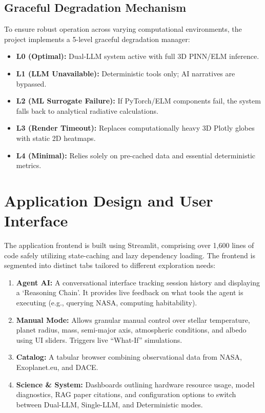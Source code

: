 \documentclass[12pt,a4paper]{article}
\begin{document}
\subsection{Graceful Degradation Mechanism}
To ensure robust operation across varying computational environments, the project implements a 5-level graceful degradation manager:
\begin{itemize}
    \item \textbf{L0 (Optimal):} Dual-LLM system active with full 3D PINN/ELM inference.
    \item \textbf{L1 (LLM Unavailable):} Deterministic tools only; AI narratives are bypassed.
    \item \textbf{L2 (ML Surrogate Failure):} If PyTorch/ELM components fail, the system falls back to analytical radiative calculations.
    \item \textbf{L3 (Render Timeout):} Replaces computationally heavy 3D Plotly globes with static 2D heatmaps.
    \item \textbf{L4 (Minimal):} Relies solely on pre-cached data and essential deterministic metrics.
\end{itemize}

\section{Application Design and User Interface}
The application frontend is built using Streamlit, comprising over 1,600 lines of code safely utilizing state-caching and lazy dependency loading. The frontend is segmented into distinct tabs tailored to different exploration needs:

\begin{enumerate}
    \item \textbf{Agent AI:} A conversational interface tracking session history and displaying a `Reasoning Chain'. It provides live feedback on what tools the agent is executing (e.g., querying NASA, computing habitability).
    \item \textbf{Manual Mode:} Allows granular manual control over stellar temperature, planet radius, mass, semi-major axis, atmospheric conditions, and albedo using UI sliders. Triggers live ``What-If'' simulations.
    \item \textbf{Catalog:} A tabular browser combining observational data from NASA, Exoplanet.eu, and DACE. 
    \item \textbf{Science \& System:} Dashboards outlining hardware resource usage, model diagnostics, RAG paper citations, and configuration options to switch between Dual-LLM, Single-LLM, and Deterministic modes.
\end{enumerate}
\end{document}
